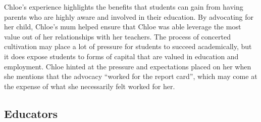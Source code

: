 Chloe's experience highlights the benefits that students can gain from having parents who are highly aware and involved in their education. By advocating for her child, Chloe's mum helped ensure that Chloe was able leverage the most value out of her relationships with her teachers. The process of concerted cultivation may place a lot of pressure for students to succeed academically, but it does expose students to forms of capital that are valued in education and employment. Chloe hinted at the pressure and expectations placed on her when she mentions that the advocacy ``worked for the report card'', which may come at the expense of what she necessarily felt worked for her.

\subsection{Educators}
